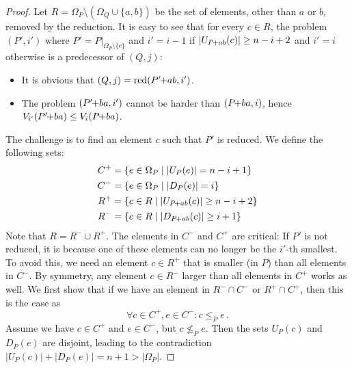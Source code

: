 \documentclass[a4paper,UKenglish,cleveref, autoref, thm-restate]{lipics-v2021}
\newcommand{\pchild}[3]{{#1}\kern-1pt{+}{#2}{#3}}
\newcommand{\reduced}[1]{\operatorname{red}#1}
\newcommand{\less}[2]{D_{#1}(#2)}
\newcommand{\greater}[2]{U_{#1}(#2)}
\begin{document}
\begin{proof}
  Let $R = \Omega_P \setminus (\Omega_Q \cup \{a, b\})$ be the set of elements, other than $a$ or $b$, removed by the reduction.
  It is easy to see that for every $c \in R$, the problem $(P', i')$ where $P' = P|_{\Omega_P \setminus \{c\}}$ and $i' = i - 1$ if $|\greater{\pchild{P}{a}{b}}{c}| \ge n - i + 2$ and $i' = i$ otherwise is a predecessor of $(Q, j)$:
  \begin{itemize}
    \item It is obvious that $(Q, j) = \reduced{(\pchild{P'}{a}{b}, i')}$.
    \item The problem $(\pchild{P'}{b}{a}, i')$ cannot be harder than $(\pchild{P}{b}{a}, i)$, hence $V_{i'}(\pchild{P'}{b}{a}) \leq V_i(\pchild{P}{b}{a})$.
  \end{itemize}
  The challenge is to find an element $c$ such that $P'$ is reduced.
  We define the following sets:
  \begin{align*}
    C^+ & = \{e \in \Omega_P \mid |\greater{P}{e}| = n - i + 1\}            \\
    C^- & = \{e \in \Omega_P \mid |\less{P}{e}| = i \}                      \\
    R^+ & = \{c \in R \mid |\greater{\pchild{P}{a}{b}}{c}| \ge n - i + 2 \} \\
    R^- & = \{c \in R \mid |\less{\pchild{P}{a}{b}}{c}| \ge i + 1 \}
  \end{align*}
  Note that $R = R^- \cup R^+$.
  The elements in $C^-$ and $C^+$ are critical:
  If $P'$ is not reduced, it is because one of these elements can no longer be the $i'$-th smallest.
  To avoid this, we need an element $c \in R^+$ that is smaller (in $P$) than all elements in $C^-$.
  By symmetry, any element $c \in R^-$ larger than all elements in $C^+$ works as well.
  We first show that if we have an element in $R^- \cap C^-$ or $R^+ \cap C^+$, then this is the case as
  \begin{equation}
    \forall c \in C^+, e \in C^- \colon c \le_P e\,\text{.}
  \end{equation}
  Assume we have $c \in C^+$ and $e \in C^-$, but $c \not\le_P e$.
  Then the sets $\greater{P}{c}$ and $\less{P}{e}$ are disjoint, leading to the contradiction $|\greater{P}{c}| + |\less{P}{e}| = n + 1 > |\Omega_P|$.


\end{proof}
\end{document}
